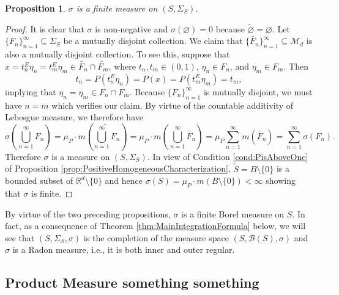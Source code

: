 \documentclass[11pt]{article}
\theoremstyle{theorem}
\newtheorem{proposition}[theorem]{Proposition}
\begin{document}
\begin{proposition}\label{prop:sigmaisameaure}
$\sigma$ is a finite measure on $(S,\Sigma_S)$.
\end{proposition}
\begin{proof}

\noindent It is clear that $\sigma$ is non-negative and $\sigma(\varnothing)=0$ because $\widetilde{\varnothing}=\varnothing$. Let $\{ F_n  \}^\infty_{n=1} \subseteq \Sigma_S $ be a mutually disjoint collection. We claim that $\{ \widetilde{F_n} \}_{n=1}^\infty\subseteq\mathcal{M}_d$ is also a mutually disjoint collection. To see this, suppose that $x = t_n^E \eta_n = t_m^E \eta_m\in \widetilde{F_n}\cap\widetilde{F_m}$, where $t_n,t_m \in (0,1)$, $\eta_n \in F_n$, and $\eta_m \in F_m $. Then
\begin{equation*}
    t_n = P(t_n^E \eta_n) = P(x) = P(t_m^E \eta_m) = t_m,
\end{equation*}
implying that $\eta_n = \eta_m\in F_n\cap F_m$. Because $\{F_n\}_{n=1}^\infty$ is mutually disjoint, we must have $n=m$ which verifies our claim. By virtue of the countable additivity of Lebesgue measure, we therefore have
\begin{equation*}
\sigma\left(\bigcup_{n=1}^\infty F_n\right)
    = \mu_P\cdot m\left( \widetilde{\bigcup^\infty_{n=1} F_n } \right)=\mu_P\cdot m\left( \bigcup^\infty_{n=1}\widetilde{F_n} \right)
    = \mu_P\sum^\infty_{n=1} m(\widetilde{F_n})
    = \sum^\infty_{n=1}\sigma(F_n).
\end{equation*}
Therefore $\sigma$ is a measure on $(S,\Sigma_S)$. In view of Condition \ref{cond:PisAboveOne} of Proposition \ref{prop:PositiveHomogeneousCharacterization}, $\widetilde{S}=B\setminus\{0\}$ is a bounded subset of $\mathbb{R}^d\setminus\{0\}$ and hence $\sigma(S)=\mu_P\cdot m(B\setminus\{0\})<\infty$ showing that $\sigma$ is finite.
\end{proof}

\noindent By virtue of the two preceding propositions, $\sigma$ is a finite Borel measure on $S$. In fact, as a consequence of Theorem \ref{thm:MainIntegrationFormula} below, we will see that $(S,\Sigma_S,\sigma)$ is the completion of the measure space $(S,\mathcal{B}(S),\sigma)$ and $\sigma$ is a Radon measure, i.e., it is both inner and outer regular. 

\subsection{Product Measure something something}\label{subsec:ProductMeasure}
\end{document}
